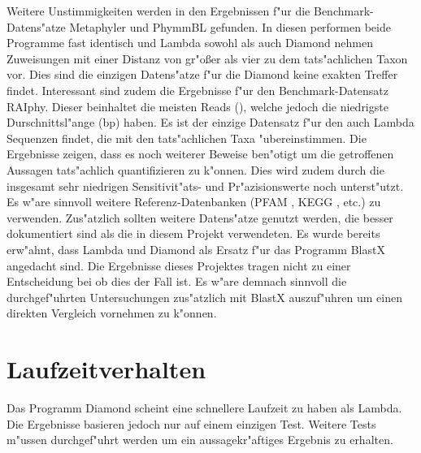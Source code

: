 \documentclass[10pt, a4paper]{report}[08.12.2015]
\begin{document}
      Weitere Unstimmigkeiten werden in den Ergebnissen f"ur die Benchmark-Datens"atze 		  Metaphyler und PhymmBL gefunden. In
      diesen performen beide Programme fast identisch und Lambda sowohl 
      als auch Diamond nehmen Zuweisungen mit einer Distanz von gr"o{\ss}er 		  als vier zu dem tats"achlichen Taxon vor. Dies sind die einzigen
      Datens"atze f"ur die Diamond keine exakten Treffer findet.
      \newline 
      Interessant sind zudem die Ergebnisse f"ur den Benchmark-Datensatz RAIphy. Dieser
      beinhaltet die meisten Reads (), welche
      jedoch die niedrigste Durschnittsl"ange (bp) haben. Es ist der
      einzige Datensatz f"ur den auch Lambda Sequenzen findet, die mit den 
      tats"achlichen Taxa "ubereinstimmen.\newline
      Die Ergebnisse zeigen, dass es noch weiterer Beweise ben"otigt um die
      getroffenen Aussagen tats"achlich quantifizieren zu k"onnen. Dies wird
      zudem durch die insgesamt sehr niedrigen Sensitivit"ats- und 					  Pr"azisionswerte noch unterst"utzt. Es w"are sinnvoll weitere
      Referenz-Datenbanken (PFAM \cite{finn2016}, KEGG \cite{kanehisa1996}, 		  etc.) zu 
      verwenden. Zus"atzlich sollten weitere Datens"atze genutzt werden, die
      besser dokumentiert sind als die in diesem Projekt verwendeten.
      \newline
      Es wurde bereits erw"ahnt, dass Lambda und Diamond als Ersatz f"ur das
      Programm BlastX angedacht sind. Die Ergebnisse dieses Projektes tragen
      nicht zu einer Entscheidung bei ob dies der Fall ist. Es w"are demnach 
      sinnvoll die durchgef"uhrten Untersuchungen zus"atzlich mit BlastX 
      auszuf"uhren um einen direkten Vergleich vornehmen zu k"onnen. 
    \section{Laufzeitverhalten}
      Das Programm Diamond scheint eine schnellere Laufzeit zu haben als
      Lambda. Die Ergebnisse basieren jedoch nur auf einem einzigen
      Test. Weitere Tests m"ussen durchgef"uhrt werden um ein
      aussagekr"aftiges Ergebnis zu erhalten.    
         
         
    
    \newpage
    \newpage
    
\end{document}
